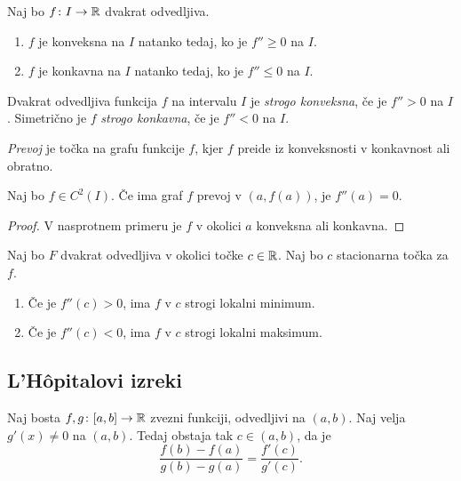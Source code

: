 \documentclass[12pt, a4paper]{article}
\begin{document}
\begin{posledica}
Naj bo $f\colon I\to\mathbb{R}$ dvakrat odvedljiva.

\begin{enumerate}[label=\roman*)]
\item $f$ je konveksna na $I$ natanko tedaj, ko je $f''\geq 0$ na $I$.
\item $f$ je konkavna na $I$ natanko tedaj, ko je $f''\leq 0$ na $I$.
\end{enumerate}
\end{posledica}

\begin{definicija}
Dvakrat odvedljiva funkcija $f$ na intervalu $I$ je \emph{strogo konveksna}, če je $f''>0$ na $I$. Simetrično je $f$ \emph{strogo konkavna}, če je $f''<0$ na $I$.
\end{definicija}

\begin{definicija}
\emph{Prevoj} je točka na grafu funkcije $f$, kjer $f$ preide iz konveksnosti v konkavnost ali obratno.
\end{definicija}

\begin{posledica}
Naj bo $f\in C^2(I)$. Če ima graf $f$ prevoj v $(a,f(a))$, je $f''(a)=0$.
\end{posledica}

\begin{proof}
V nasprotnem primeru je $f$ v okolici $a$ konveksna ali konkavna.
\end{proof}

\begin{posledica}
Naj bo $F$ dvakrat odvedljiva v okolici točke $c\in\mathbb{R}$. Naj bo $c$ stacionarna točka za $f$.

\begin{enumerate}[label=\roman*)]
\item Če je $f''(c)>0$, ima $f$ v $c$ strogi lokalni minimum.
\item Če je $f''(c)<0$, ima $f$ v $c$ strogi lokalni maksimum.
\end{enumerate}
\end{posledica}

\obvs

\newpage

\subsection{L'Hôpitalovi izreki}

\begin{izrek}
Naj bosta $f,g\colon[a,b]\to\mathbb{R}$ zvezni funkciji, odvedljivi na $(a,b)$. Naj velja $g'(x)\ne 0$ na $(a,b)$. Tedaj obstaja tak $c\in(a,b)$, da je
\[
\frac{f(b)-f(a)}{g(b)-g(a)}=\frac{f'(c)}{g'(c)}.
\]
\end{izrek}
\end{document}
